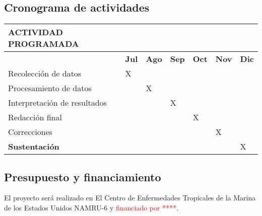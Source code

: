 \documentclass[]{article}
\begin{document}
\subsection{Cronograma de actividades}\label{cronograma-de-actividades}

\begin{longtable}[]{@{}lllllll@{}}
\toprule
\textbf{ACTIVIDAD PROGRAMADA} & & & & & &\tabularnewline
\midrule
\endhead
& \textbf{Jul} & \textbf{Ago} & \textbf{Sep} & \textbf{Oct} &
\textbf{Nov} & \textbf{Dic}\tabularnewline
Recolección de datos & X & & & & &\tabularnewline
Procesamiento de datos & & X & & & &\tabularnewline
Interpretación de resultados & & & X & & &\tabularnewline
Redacción final & & & & X & &\tabularnewline
Correcciones & & & & & X &\tabularnewline
\textbf{Sustentación} & & & & & & X\tabularnewline
\bottomrule
\end{longtable}

\subsection{Presupuesto y
financiamiento}\label{presupuesto-y-financiamiento}

El proyecto será realizado en El Centro de Enfermedades Tropicales de la
Marina de los Estados Unidos NAMRU-6 y
\textcolor{red}{financiado por ****}.
\end{document}
